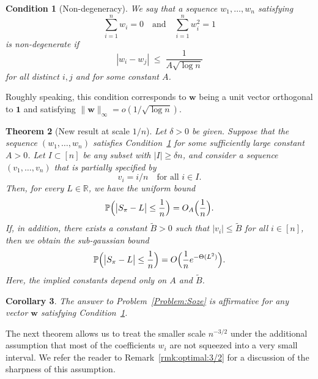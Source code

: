 \documentclass[reqno]{amsart}
\newcommand\R{{\mathbb{R}}}
\renewcommand\P{{\mathbb{P}}}
\newcommand\BMw{{\bm w}}
\theoremstyle{plain}
\newtheorem{theorem}{Theorem}[section]
\newtheorem{corollary}[theorem]{Corollary}
\newtheorem{condition}[theorem]{Condition}
\theoremstyle{definition}
\begin{document}
\begin{condition}[Non-degeneracy]\label{cond:separation}
We say that a sequence $w_1,\dots,w_n$ satisfying
\[
\sum_{i=1}^n w_i = 0
\quad\text{and}\quad
\sum_{i=1}^n w_i^2 = 1
\]
is \emph{non-degenerate} if
\begin{equation}\label{eqn:separation}
|w_i-w_j| \;\le\; \frac{1}{A\sqrt{\log n}}
\end{equation}
for all distinct $i,j$ and for some constant $A$.
\end{condition}

Roughly speaking, this condition corresponds to $\BMw$ being a unit vector
orthogonal to $\mathbf{1}$ and satisfying
$\|\BMw\|_{\infty}=o(1/\sqrt{\log n})$.

\begin{theorem}[New result at scale $1/n$]\label{thm:cont:1}
Let $\delta>0$ be given. Suppose that the sequence $(w_1,\ldots,w_n)$ satisfies
Condition~\ref{cond:separation} for some sufficiently large constant $A>0$.
Let $I\subset[n]$ be any subset with $|I|\ge \delta n$, and consider a sequence
$(v_1,\ldots,v_n)$ that is partially specified by
\[
v_i = i/n \quad \text{for all } i\in I.
\]
Then, for every $L\in\R$, we have the uniform bound
\begin{equation}\label{eqn:1:u}
\P\Bigl(\bigl|S_{\pi}-L\bigr|\le \frac{1}{n}\Bigr)
= O_{A}\Big(\frac{1}{n}\Big).
\end{equation}
If, in addition, there exists a constant $\widetilde{B}>0$ such that
$|v_i|\le \widetilde{B}$ for all $i\in[n]$, then we obtain the sub-gaussian bound
\begin{equation}\label{eqn:1:L}
\P\Bigl(\bigl|S_{\pi}-L\bigr|\le \frac{1}{n}\Bigr)
= O\Big(\frac{1}{n} e^{-\Theta(L^{2})}\Big).
\end{equation}
Here, the implied constants depend only on $A$ and $\widetilde{B}$.
\end{theorem}

\begin{corollary}
The answer to Problem~\ref{Problem:Soze} is affirmative for any vector $\BMw$
satisfying Condition~\ref{cond:separation}.
\end{corollary}

The next theorem allows us to treat the smaller scale $n^{-3/2}$ under the
additional assumption that most of the coefficients $w_i$ are not squeezed
into a very small interval. We refer the reader to
Remark~\ref{rmk:optimal:3/2} for a discussion of the sharpness of this
assumption.
\end{document}
